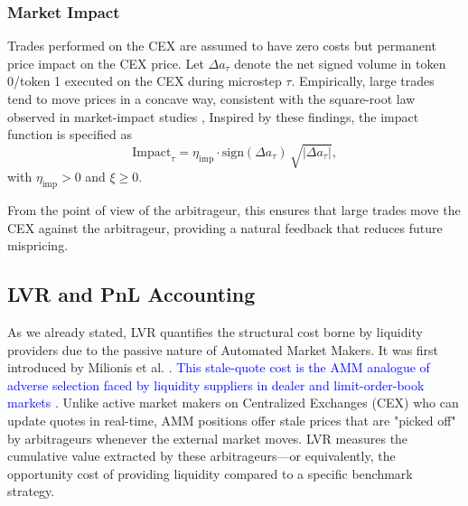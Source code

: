 \documentclass[11pt]{article}
\begin{document}
\subsubsection{Market Impact}
\label{subsubsec:impact}
Trades performed on the CEX are assumed to have zero costs but permanent price impact on the CEX price.
Let $\Delta a_\tau$ denote the net signed volume in token 0/token 1 executed on the CEX during microstep $\tau$. Empirically, 
large trades tend to move prices in a concave way, consistent with the square-root law observed in market-impact 
studies \cite{PhysRevX.1.021006,Maitrier03042026}, Inspired by these findings, the impact function is specified as
\begin{equation}
  \mathrm{Impact}_\tau =
  \eta_{\text{imp}} \cdot \mathrm{sign}(\Delta a_\tau)\,\sqrt{\bigl|\Delta a_\tau\bigr|},
  \label{eq:impact}
\end{equation}
with $\eta_{\text{imp}}>0$ and $\xi \geq 0$.

From the point of view of the arbitrageur, this ensures that large trades move the CEX against the arbitrageur, 
providing a natural feedback that reduces future mispricing.

\subsection{LVR and PnL Accounting}
\label{sec:lvr}

As we already stated, LVR quantifies the structural cost borne by liquidity providers due to the passive nature of 
Automated Market Makers. It was first introduced by Milionis et al. \cite{milionis2023}. \textcolor{blue}{This stale-quote cost is the AMM analogue of adverse selection faced by liquidity suppliers in dealer and limit-order-book markets \cite{ho1983,avellaneda2008,milionis2023,cartea2023}.} Unlike active market
makers on Centralized Exchanges (CEX) who can update quotes in real-time, AMM positions offer stale prices that 
are "picked off" by arbitrageurs whenever the external market moves. LVR measures the cumulative value extracted 
by these arbitrageurs---or equivalently, the opportunity cost of providing liquidity compared to a specific benchmark 
strategy.
\end{document}
